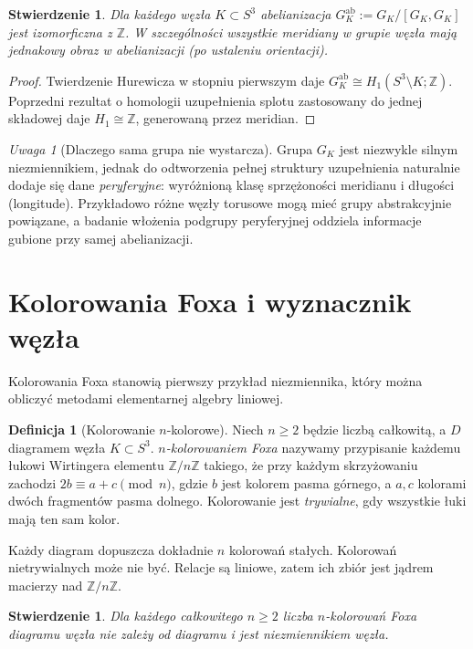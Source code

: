 \documentclass[11pt,a4paper]{report}
\numberwithin{equation}{section}
\theoremstyle{plain}
\newtheorem{stwierdzenie}[twierdzenie]{Stwierdzenie}
\theoremstyle{definition}
\newtheorem{definicja}[twierdzenie]{Definicja}
\theoremstyle{remark}
\newtheorem{uwaga}[twierdzenie]{Uwaga}
\begin{document}
\begin{stwierdzenie}
Dla każdego węzła $K\subset S^3$ abelianizacja
$G_K^{\mathrm{ab}}:=G_K/[G_K,G_K]$ jest izomorficzna z $\mathbb Z$.
W szczególności wszystkie meridiany w grupie węzła mają
jednakowy obraz w abelianizacji (po ustaleniu orientacji).
\end{stwierdzenie}

\begin{proof}
Twierdzenie Hurewicza w stopniu pierwszym daje
$G_K^{\mathrm{ab}}\cong H_1(S^3\setminus K;\mathbb Z)$.
Poprzedni rezultat o homologii uzupełnienia splotu zastosowany
do jednej składowej daje $H_1\cong\mathbb Z$, generowaną
przez meridian.
\end{proof}

\begin{uwaga}[Dlaczego sama grupa nie wystarcza]
Grupa $G_K$ jest niezwykle silnym niezmiennikiem, jednak do
odtworzenia pełnej struktury uzupełnienia naturalnie dodaje się
dane \emph{peryferyjne}: wyróżnioną klasę sprzężoności meridianu
i długości (longitude). Przykładowo różne węzły torusowe mogą
mieć grupy abstrakcyjnie powiązane, a badanie włożenia podgrupy
peryferyjnej oddziela informacje gubione przy samej abelianizacji.
\end{uwaga}

\section{Kolorowania Foxa i wyznacznik węzła}
\label{sec:kt-fox}

Kolorowania Foxa stanowią pierwszy przykład niezmiennika, który
można obliczyć metodami elementarnej algebry liniowej.

\begin{definicja}[Kolorowanie $n$-kolorowe]
Niech $n\geq2$ będzie liczbą całkowitą, a $D$ diagramem węzła
$K\subset S^3$. \emph{$n$-kolorowaniem Foxa} nazywamy przypisanie
każdemu łukowi Wirtingera elementu $\mathbb Z/n\mathbb Z$ takiego,
że przy każdym skrzyżowaniu zachodzi
$2b\equiv a+c\pmod n$, gdzie $b$ jest kolorem pasma górnego,
a $a,c$ kolorami dwóch fragmentów pasma dolnego.
Kolorowanie jest \emph{trywialne}, gdy wszystkie łuki mają ten sam kolor.
\end{definicja}

Każdy diagram dopuszcza dokładnie $n$ kolorowań stałych.
Kolorowań nietrywialnych może nie być. Relacje są liniowe,
zatem ich zbiór jest jądrem macierzy nad $\mathbb Z/n\mathbb Z$.

\begin{stwierdzenie}
Dla każdego całkowitego $n\geq2$ liczba $n$-kolorowań Foxa diagramu
węzła nie zależy od diagramu i jest niezmiennikiem węzła.
\end{stwierdzenie}
\end{document}
